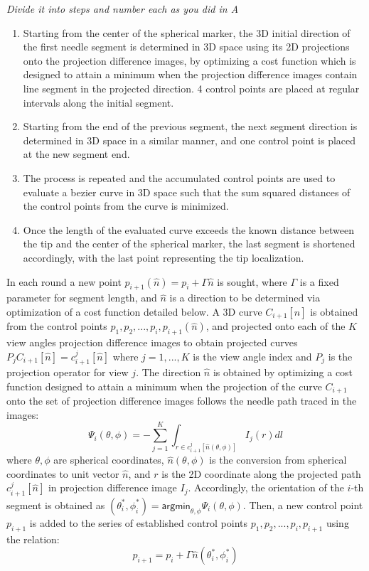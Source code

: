 \documentclass[letterpaper, 11 pt, conference]{ieeeconf}  %
\begin{document}
\textit{Divide it into steps and number each as you did in A}
\begin{enumerate}
    \item Starting from the center of the spherical marker, the 3D initial direction of the first needle segment is determined in 3D space using its 2D projections onto the projection difference images, by optimizing a cost function which is designed to attain a minimum when the projection difference images contain line segment in the projected direction. 4 control points are placed at regular intervals along the initial segment.
    \item Starting from the end of the previous segment, the next segment direction is determined in 3D space in a similar manner, and one control point is placed at the new segment end.
    \item The process is repeated and the accumulated control points are used to evaluate a bezier curve in 3D space such that the sum squared distances of the control points from the curve is minimized.
    \item Once the length of the evaluated curve exceeds the known distance between the tip and the center of the spherical marker, the last segment is shortened accordingly, with the last point representing the tip localization.
\end{enumerate}

In each round a new point $p_{i+1}(\hat{n}) = p_i + \Gamma \hat{n}$ is sought, where $\Gamma$ is a fixed parameter for segment length, and $\hat{n}$ is a direction to be determined via optimization of a cost function detailed below.
A 3D curve $C_{i+1}[\hat{n}]$ is obtained from the control points $p_1, p_2, ..., p_i, p_{i+1}(\hat{n})$, and projected onto each of the $K$ view angles projection difference images to obtain projected curves $P_j C_{i+1}[\hat{n}] = c_{i+1}^j[\hat{n}]$ where $j=1,...,K$ is the view angle index and $P_j$ is the projection operator for view $j$.
The direction $\hat{n}$ is obtained by optimizing a cost function designed to attain a minimum when the projection of the curve $C_{i+1}$ onto the set of projection difference images follows the needle path traced in the images:
\[ \Psi_i(\theta, \phi) = -\sum_{j=1}^K{\int_{r \in c_{i+1}^j[\hat{n}(\theta, \phi)]} {I_j(r)dl}} \]
where $ \theta, \phi$ are spherical coordinates, $ \hat{n}(\theta, \phi) $ is the conversion from spherical coordinates to unit vector $ \hat{n} $, and $r$ is the 2D coordinate along the projected path $c_{i+1}^j[\hat{n}]$ in projection difference image $I_j$. 
Accordingly, the orientation of the $i$-th segment is obtained as $(\theta_i^*, \phi_i^*) = \textsf{argmin}_{\theta, \phi} \Psi_i ( \theta, \phi)$. Then, a new control point $p_{i+1}$ is added to the series of established control points $p_1, p_2, ..., p_i, p_{i+1}$ using the relation:
$$ p_{i+1} = p_i + \Gamma \hat{n}(\theta_i^*, \phi_i^*) $$
\end{document}

